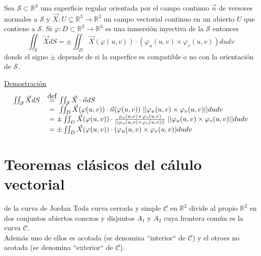 \documentclass{report}
\newcommand\defeq{\stackrel{\mathclap{\normalfont\mbox{def}}}{~=~}}
\newcommand\reals{\mathds{R}}
\begin{document}
\begin{propobox}
	Sea $\mathcal{S} \subset \reals^3$ una superficie regular orientada por el campo continuo $\vec{n}$ de versores normales a $\mathcal{S}$ y $\vec{X} : U \subseteq \reals^3 \rightarrow \reals^3$ un campo vectorial continuo en un abierto $U$ que contiene a $\mathcal{S}$.
	Si $\varphi : D \subset \reals^2 \rightarrow \reals^3$ es una inmersión inyectiva de la $\mathcal{S}$ entonces
	\begin{equation}
		\boxed{
		\iint_{\mathcal{S}}{\vec{X}dS} =
		\pm \iint_D{\vec{X}(\varphi (u,v)) \cdot (\varphi_u (u,v) \times \varphi_v (u,v)) dudv}
		}
		\label{eq:form_int_s_vec}
	\end{equation}
	donde el signo $\pm$ depende de si la superfice es compatible o no con la orientación de $\mathcal{S}$.
\end{propobox}
\underline{Demostración} \\
\[
	\begin{array}{ll}
		\iint_\mathcal{S}{\vec{X}dS} & \defeq \iint_{\mathcal{S}}{\vec{X}\cdot\vec{n}dS}                                                                                                                                     \\
		                             & ~=~ \iint_D{\vec{X}(\varphi (u,v))\cdot \vec{n}(\varphi (u,v)) ~||\varphi_u (u,v) \times \varphi_v (u,v)||dudv}                                                                       \\
		                             & ~= \pm \iint_D{\vec{X}(\varphi (u,v))\cdot \frac{\varphi_u (u,v) \times \varphi_v (u,v)}{||\varphi_u (u,v) \times \varphi_v (u,v)||} ~||\varphi_u (u,v) \times \varphi_v (u,v)||dudv} \\
		                             & ~= \pm \iint_D{\vec{X}(\varphi (u,v)) \cdot (\varphi_u (u,v) \times \varphi_v (u,v)) dudv}
	\end{array}
\]

\chapter{Teoremas clásicos del cálulo vectorial}

\begin{teobox}{de la curva de Jordan}
	Toda curva cerrada y simple $\mathcal{C}$ en $\reals^2$ divide al propio $\reals^2$ en dos conjuntos abiertos conexos y disjuntos $A_1$ y $A_2$ cuya frontera común es la curva $\mathcal{C}$. \\
	Además uno de ellos es acotada (se denomina ``interior`` de $\mathcal{C}$) y el otroes no acotada (se denomina ``exterior`` de $\mathcal{C}$).
\end{teobox}
\end{document}
